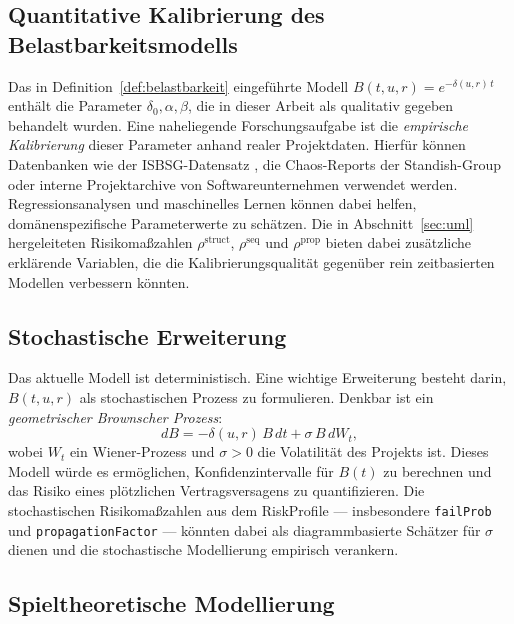 ﻿\documentclass[a4paper,12pt]{article}
\theoremstyle{definition}
\begin{document}
\subsection{Quantitative Kalibrierung des Belastbarkeitsmodells}

Das in Definition~\ref{def:belastbarkeit} eingef\"uhrte Modell $B(t, u, r) = e^{-\delta(u,r)\,t}$
enth\"alt die Parameter $\delta_0, \alpha, \beta$, die in dieser Arbeit als qualitativ
gegeben behandelt wurden. Eine naheliegende Forschungsaufgabe ist die \emph{empirische
Kalibrierung} dieser Parameter anhand realer Projektdaten. Hierf\"ur k\"onnen Datenbanken
wie der ISBSG-Datensatz \cite{isbsg2020}, die Chaos-Reports der Standish-Group \cite{standish2020}
oder interne Projektarchive von Softwareunternehmen verwendet werden. Regressionsanalysen
und maschinelles Lernen k\"onnen dabei helfen, dom\"anenspezifische Parameterwerte zu
sch\"atzen. Die in Abschnitt~\ref{sec:uml} hergeleiteten Risikoma\ss{}zahlen
$\rho^{\mathrm{struct}}$, $\rho^{\mathrm{seq}}$ und $\rho^{\mathrm{prop}}$ bieten
dabei zus\"atzliche erkl\"arende Variablen, die die Kalibrierungsqualit\"at gegen\"uber
rein zeitbasierten Modellen verbessern k\"onnten.

\subsection{Stochastische Erweiterung}

Das aktuelle Modell ist deterministisch. Eine wichtige Erweiterung besteht darin,
$B(t, u, r)$ als stochastischen Prozess zu formulieren. Denkbar ist ein
\emph{geometrischer Brownscher Prozess}:
\[
    dB = -\delta(u,r)\, B\, dt + \sigma\, B\, dW_t,
\]
wobei $W_t$ ein Wiener-Prozess und $\sigma > 0$ die Volatilit\"at des Projekts ist.
Dieses Modell w\"urde es erm\"oglichen, Konfidenzintervalle f\"ur $B(t)$ zu berechnen
und das Risiko eines pl\"otzlichen Vertragsversagens zu quantifizieren. Die
stochastischen Risikoma\ss{}zahlen aus dem \textsf{RiskProfile} ---
insbesondere \texttt{failProb} und \texttt{propagationFactor} --- k\"onnten dabei als
diagrammbasierte Sch\"atzer f\"ur $\sigma$ dienen und die stochastische Modellierung
empirisch verankern.

\subsection{Spieltheoretische Modellierung}
\end{document}
